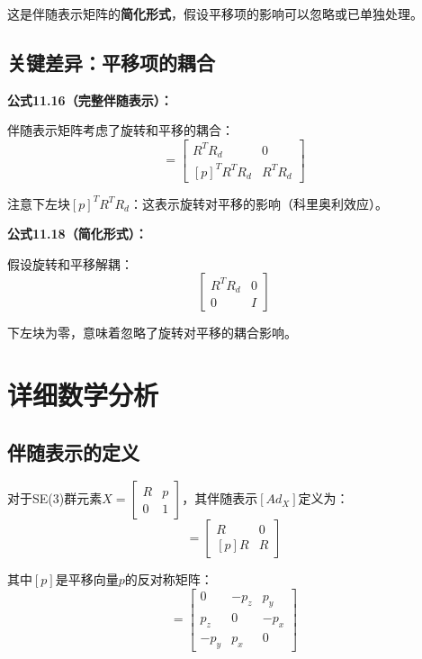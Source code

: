 \documentclass[12pt,a4paper]{article}
\begin{document}
这是伴随表示矩阵的\textbf{简化形式}，假设平移项的影响可以忽略或已单独处理。

\subsection{关键差异：平移项的耦合}

\textbf{公式11.16（完整伴随表示）：}

伴随表示矩阵考虑了旋转和平移的耦合：
\begin{equation}
[Ad_{X^{-1}X_d}] = \begin{bmatrix}
R^T R_d & 0 \\
[p]^T R^T R_d & R^T R_d
\end{bmatrix}
\end{equation}

注意下左块$[p]^T R^T R_d$：这表示旋转对平移的影响（科里奥利效应）。

\textbf{公式11.18（简化形式）：}

假设旋转和平移解耦：
\begin{equation}
\begin{bmatrix}
R^T R_d & 0 \\
0 & I
\end{bmatrix}
\end{equation}

下左块为零，意味着忽略了旋转对平移的耦合影响。

\section{详细数学分析}

\subsection{伴随表示的定义}

对于SE(3)群元素$X = \begin{bmatrix} R & p \\ 0 & 1 \end{bmatrix}$，其伴随表示$[Ad_X]$定义为：
\begin{equation}
[Ad_X] = \begin{bmatrix}
R & 0 \\
[p]R & R
\end{bmatrix}
\end{equation}

其中$[p]$是平移向量$p$的反对称矩阵：
\begin{equation}
[p] = \begin{bmatrix}
0 & -p_z & p_y \\
p_z & 0 & -p_x \\
-p_y & p_x & 0
\end{bmatrix}
\end{equation}
\end{document}
